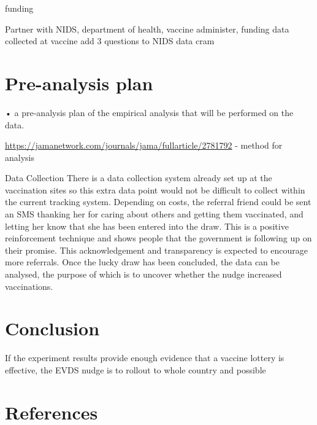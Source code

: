 \documentclass[11pt,preprint, authoryear]{elsarticle}
\numberwithin{equation}{section}
\numberwithin{figure}{section}
\numberwithin{table}{section}
\begin{document}
funding

Partner with NIDS, department of health, vaccine administer, funding
data collected at vaccine add 3 questions to NIDS data cram

\hypertarget{pre-analysis-plan}{%
\section{\texorpdfstring{Pre-analysis plan
\label{pre}}{Pre-analysis plan }}\label{pre-analysis-plan}}

• a pre-analysis plan of the empirical analysis that will be performed
on the data.

\url{https://jamanetwork.com/journals/jama/fullarticle/2781792} - method
for analysis

Data Collection There is a data collection system already set up at the
vaccination sites so this extra data point would not be difficult to
collect within the current tracking system. Depending on costs, the
referral friend could be sent an SMS thanking her for caring about
others and getting them vaccinated, and letting her know that she has
been entered into the draw. This is a positive reinforcement technique
and shows people that the government is following up on their promise.
This acknowledgement and transparency is expected to encourage more
referrals. Once the lucky draw has been concluded, the data can be
analysed, the purpose of which is to uncover whether the nudge increased
vaccinations.

\hfill

\hypertarget{conclusion}{%
\section{\texorpdfstring{Conclusion
\label{con}}{Conclusion }}\label{conclusion}}

If the experiment results provide enough evidence that a vaccine lottery
is effective, the EVDS nudge is to rollout to whole country and possible

\newpage

\hypertarget{references}{%
\section*{References}\label{references}}
\end{document}
